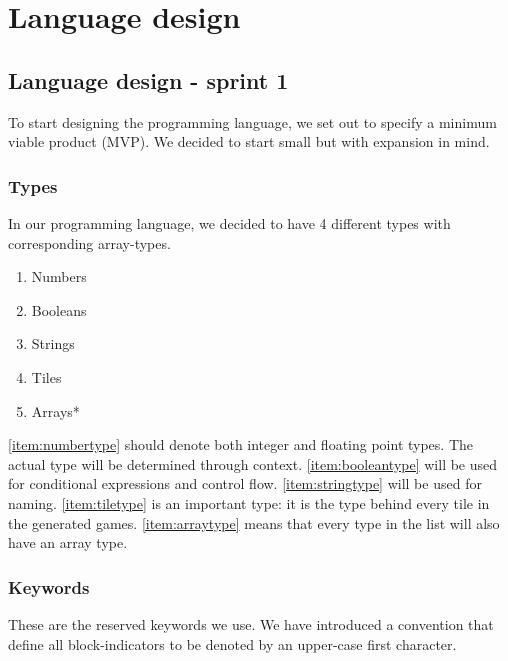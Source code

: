 \chapter{Language design}


\section{Language design - sprint 1}

To start designing the programming language, we set out to specify a minimum viable product (MVP). We decided to start small but with expansion in mind.

\subsection{Types}
In our programming language, we decided to have 4 different types with corresponding array-types.

\begin{multicols}{3}
\begin{enumerate}
    \item Numbers\label{item:numbertype}
    \item Booleans\label{item:booleantype}
    \item Strings\label{item:stringtype}
    \item Tiles\label{item:tiletype}
    \item Arrays*\label{item:arraytype}
\end{enumerate}
\end{multicols}

\ref{item:numbertype} should denote both integer and floating point types. The actual type will be determined through context. \ref{item:booleantype} will be used for conditional expressions and control flow.
\ref{item:stringtype} will be used for naming.
\ref{item:tiletype} is an important type: it is the type behind every tile in the generated games.
\ref{item:arraytype} means that every type in the list will also have an array type.


\subsection{Keywords}
These are the reserved keywords we use. We have introduced a convention that define all block-indicators to be denoted by an upper-case first character.

